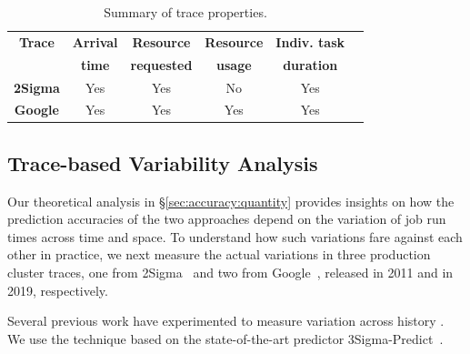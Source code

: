 \begin{table}[tp]
\caption{Summary of trace properties.}
\label{table:traceSummary}
\centering
{\small
\vspace{-0.1in}
\begin{tabular}{|c|c|c|c|c|c|}
\hline
		\textbf{ Trace} & \textbf{Arrival} & \textbf{Resource} & \textbf{Resource}  & \textbf{Indiv. task} \\
			& \textbf{time} & \textbf{requested} & \textbf{usage} & \textbf{duration}\\
	 
\hline
	  \textbf{2Sigma} & Yes & Yes & No & Yes\\
\hline
	  \textbf{Google} & Yes & Yes & Yes & Yes\\
\hline
%	 
\end{tabular}
\vspace{-0.1in}
}
\end{table}


\subsection{Trace-based Variability Analysis}
\label{sec:accuracy:trace}


Our theoretical analysis in \S\ref{sec:accuracy:quantity} provides 
insights on how the prediction accuracies of the two approaches depend
on the variation of job run times across time and space.
To understand how such variations fare against each other in practice,
we next measure the actual variations
in three production cluster traces, one from 2Sigma~\cite{2Sigma:website} and
two from Google~\cite{googleTraceGithub, googleClusterData2019},
released in 2011 and in 2019, respectively.

Several previous work have experimented to
measure variation across history \cite{morpheus, corral, 3Sigma,
jockey:eurosys2012}. We use the technique based on the state-of-the-art
predictor 3Sigma-Predict~\cite{3Sigma}.
\fi

